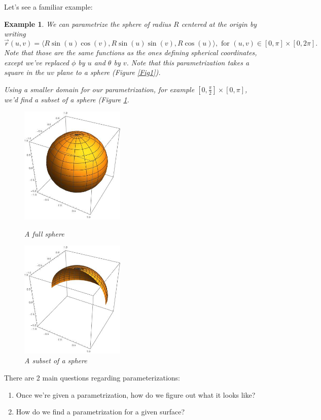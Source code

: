 \documentclass[12pt]{article}
\newcommand{\vr}{\vec{r}{}}
\renewcommand{\lg}{\langle}
\newcommand{\rg}{\rangle}
\newtheorem{example}{Example}
\begin{document}
Let's see a familiar example:
\begin{example}
We can parametrize the sphere of radius $R$ centered at the origin by writing $$\vr(u,v)=\lg R\sin(u)\cos(v),R\sin(u)\sin(v),R\cos(u)\rg,\text{ for }(u,v)\in[0,\pi]\times[0,2\pi].$$ Note that those are the same functions as the ones defining spherical coordinates, except we've replaced $\phi$ by $u$ and $\theta$ by $v$. Note that this parametrization takes a square in the $uv$ plane to a sphere (Figure \ref{Fig1}). 

Using a smaller domain for our parametrization, for example $[0,\frac{\pi}{2}]\times[0,\pi]$, we'd find a subset of a sphere (Figure \ref{Fig2}.
\begin{figure}[h]
\centering
\parbox{5cm}{
\includegraphics[width=5cm]{full.jpeg}
\caption{A full sphere}
\label{Fig1}}
\qquad
\begin{minipage}{5cm}
\includegraphics[width=5cm]{quarter.jpeg}
\caption{A subset of a sphere}
\label{Fig2}
\end{minipage}
\end{figure}

\end{example}


There are 2 main questions regarding parameterizations:
\begin{enumerate}
\item Once we're given a parametrization, how do we figure out what it looks like?
\item How do we find a parametrization for a given surface?
\end{enumerate}
\end{document}

